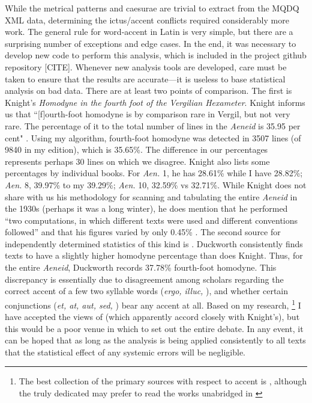 \documentclass[11pt,a4paper]{scrartcl} %
\begin{document}
{While the metrical patterns and caesurae are trivial to extract from the MQDQ XML data, determining the ictus/accent conflicts required considerably more work. The general rule for word-accent in Latin is very simple, but there are a surprising number of exceptions and edge cases. In the end, it was necessary to develop new code to perform this analysis, which is included in the project github repository [CITE]. Whenever new analysis tools are developed, care must be taken to ensure that the results are accurate---it is useless to base statistical analysis on bad data. There are at least two points of comparison. The first is Knight's \textit{Homodyne in the fourth foot of the Vergilian Hexameter}. Knight informs us that ``[f]ourth-foot homodyne is by comparison rare in Vergil, but not very rare. The percentage of it to the total number of lines in the \textit{Aeneid} is 35.95 per cent" \cite[186]{knight_homodyne_1931}. Using my algorithm, fourth-foot homodyne was detected in 3507 lines (of 9840 in my edition), which is 35.65\%. The difference in our percentages represents perhaps 30 lines on which we disagree. Knight also lists some percentages by individual books. For \textit{Aen.} 1, he has 28.61\% while I have 28.82\%; \textit{Aen.} 8, 39.97\% to my 39.29\%; \textit{Aen.} 10, 32.59\% vs 32.71\%. While Knight does not share with us his methodology for scanning and tabulating the entire \textit{Aeneid} in the 1930s (perhaps it was a long winter), he does mention that he performed ``two computations, in which different texts were used and different conventions followed'' and that his figures varied by only 0.45\% \cite[186 n. 1]{knight_homodyne_1931}. The second source for independently determined statistics of this kind is \citet[19-20, plus final Table]{duckworth_vergil_1969}. Duckworth consistently finds texts to have a slightly higher homodyne percentage than does Knight. Thus, for the entire \textit{Aeneid}, Duckworth records 37.78\% fourth-foot homodyne. This discrepancy is essentially due to disagreement among scholars regarding the correct accent of a few two syllable words (\textit{ergo, illuc,} \textellipsis), and whether certain conjunctions (\textit{et, at, aut, sed,} \textellipsis) bear any accent at all. Based on my research,%
\footnote{The best collection of the primary sources with respect to accent is \cite{schoell_accentu_1876}, although the truly dedicated may prefer to read the works unabridged in \cite{keil_heinrich_grammatici_1857}}
I have accepted the views of \citet[88-9]{allen_vox_1965} (which apparently accord closely with Knight's), but this would be a poor venue in which to set out the entire debate. In any event, it can be hoped that as long as the analysis is being applied consistently to all texts that the statistical effect of any systemic errors will be negligible.

}
\end{document}
